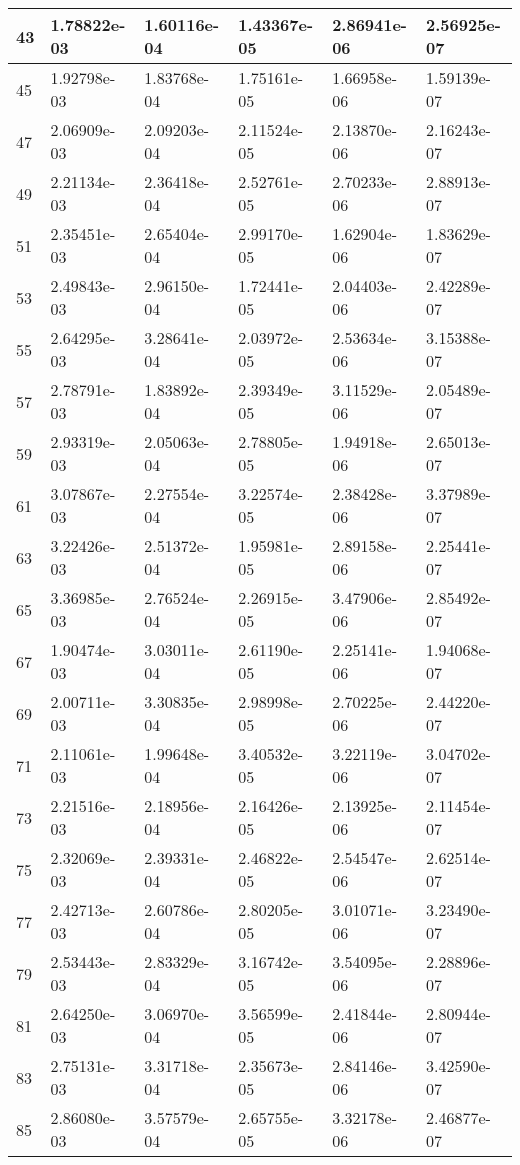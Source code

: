 \documentclass{article}
\begin{document}
\begin{table}[H]
\begin{tabular}{|l|l|l|l|l|l|}
43 & 1.78822e-03 & 1.60116e-04 & 1.43367e-05 & 2.86941e-06 & 2.56925e-07 \\ \hline
45 & 1.92798e-03 & 1.83768e-04 & 1.75161e-05 & 1.66958e-06 & 1.59139e-07 \\ \hline
47 & 2.06909e-03 & 2.09203e-04 & 2.11524e-05 & 2.13870e-06 & 2.16243e-07 \\ \hline
49 & 2.21134e-03 & 2.36418e-04 & 2.52761e-05 & 2.70233e-06 & 2.88913e-07 \\ \hline
51 & 2.35451e-03 & 2.65404e-04 & 2.99170e-05 & 1.62904e-06 & 1.83629e-07 \\ \hline
53 & 2.49843e-03 & 2.96150e-04 & 1.72441e-05 & 2.04403e-06 & 2.42289e-07 \\ \hline
55 & 2.64295e-03 & 3.28641e-04 & 2.03972e-05 & 2.53634e-06 & 3.15388e-07 \\ \hline
57 & 2.78791e-03 & 1.83892e-04 & 2.39349e-05 & 3.11529e-06 & 2.05489e-07 \\ \hline
59 & 2.93319e-03 & 2.05063e-04 & 2.78805e-05 & 1.94918e-06 & 2.65013e-07 \\ \hline
61 & 3.07867e-03 & 2.27554e-04 & 3.22574e-05 & 2.38428e-06 & 3.37989e-07 \\ \hline
63 & 3.22426e-03 & 2.51372e-04 & 1.95981e-05 & 2.89158e-06 & 2.25441e-07 \\ \hline
65 & 3.36985e-03 & 2.76524e-04 & 2.26915e-05 & 3.47906e-06 & 2.85492e-07 \\ \hline
67 & 1.90474e-03 & 3.03011e-04 & 2.61190e-05 & 2.25141e-06 & 1.94068e-07 \\ \hline
69 & 2.00711e-03 & 3.30835e-04 & 2.98998e-05 & 2.70225e-06 & 2.44220e-07 \\ \hline
71 & 2.11061e-03 & 1.99648e-04 & 3.40532e-05 & 3.22119e-06 & 3.04702e-07 \\ \hline
73 & 2.21516e-03 & 2.18956e-04 & 2.16426e-05 & 2.13925e-06 & 2.11454e-07 \\ \hline
75 & 2.32069e-03 & 2.39331e-04 & 2.46822e-05 & 2.54547e-06 & 2.62514e-07 \\ \hline
77 & 2.42713e-03 & 2.60786e-04 & 2.80205e-05 & 3.01071e-06 & 3.23490e-07 \\ \hline
79 & 2.53443e-03 & 2.83329e-04 & 3.16742e-05 & 3.54095e-06 & 2.28896e-07 \\ \hline
81 & 2.64250e-03 & 3.06970e-04 & 3.56599e-05 & 2.41844e-06 & 2.80944e-07 \\ \hline
83 & 2.75131e-03 & 3.31718e-04 & 2.35673e-05 & 2.84146e-06 & 3.42590e-07 \\ \hline
85 & 2.86080e-03 & 3.57579e-04 & 2.65755e-05 & 3.32178e-06 & 2.46877e-07 \\ \hline

\end{tabular}
\end{table}
\end{document}

